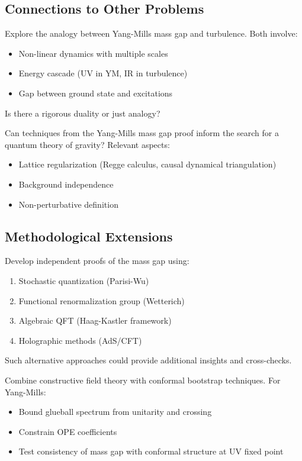 \subsection{Connections to Other Problems}

\begin{problem}
Explore the analogy between Yang-Mills mass gap and turbulence. Both involve:
\begin{itemize}
\item Non-linear dynamics with multiple scales
\item Energy cascade (UV in YM, IR in turbulence)
\item Gap between ground state and excitations
\end{itemize}
Is there a rigorous duality or just analogy?
\end{problem}

\begin{problem}
Can techniques from the Yang-Mills mass gap proof inform the search for 
a quantum theory of gravity? Relevant aspects:
\begin{itemize}
\item Lattice regularization (Regge calculus, causal dynamical triangulation)
\item Background independence
\item Non-perturbative definition
\end{itemize}
\end{problem}

\subsection{Methodological Extensions}

\begin{problem}
Develop independent proofs of the mass gap using:
\begin{enumerate}[label=(\alph*)]
\item Stochastic quantization (Parisi-Wu)
\item Functional renormalization group (Wetterich)
\item Algebraic QFT (Haag-Kastler framework)
\item Holographic methods (AdS/CFT)
\end{enumerate}
Such alternative approaches could provide additional insights and cross-checks.
\end{problem}

\begin{problem}
Combine constructive field theory with conformal bootstrap techniques. 
For Yang-Mills:
\begin{itemize}
\item Bound glueball spectrum from unitarity and crossing
\item Constrain OPE coefficients
\item Test consistency of mass gap with conformal structure at UV fixed point
\end{itemize}
\end{problem}

